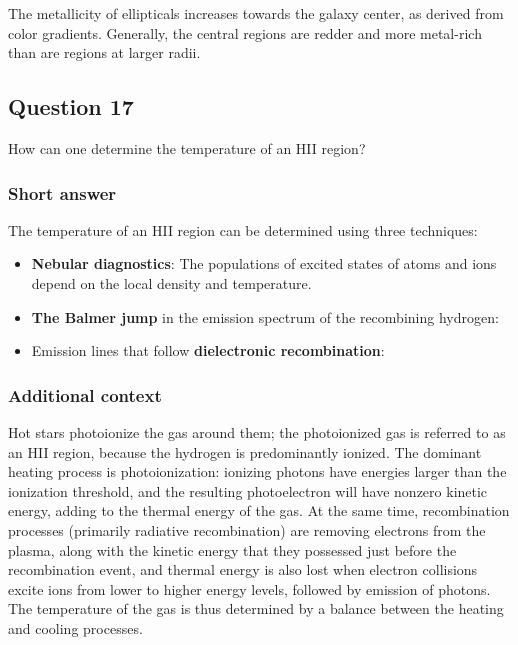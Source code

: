 \documentclass[a4paper,10pt]{article}
\begin{document}
{\noindent}The metallicity of ellipticals increases towards the galaxy center, as derived from color gradients. Generally, the central regions are redder and more metal-rich than are regions at larger radii.


\newpage
\subsection{Question 17}

How can one determine the temperature of an HII region?

\subsubsection{Short answer}

The temperature of an HII region can be determined using three techniques:

\begin{itemize}
    \item \textbf{Nebular diagnostics}: The populations of excited states of atoms and ions depend on the local density and temperature.
    \item \textbf{The Balmer jump} in the emission spectrum of the recombining hydrogen: 
    \item Emission lines that follow \textbf{dielectronic recombination}:
\end{itemize}

\subsubsection{Additional context}

{\noindent}Hot stars photoionize the gas around them; the photoionized gas is referred to as an HII region, because the hydrogen is predominantly ionized. The dominant heating process is photoionization: ionizing photons have energies larger than the ionization threshold, and the resulting photoelectron will have nonzero kinetic energy, adding to the thermal energy of the gas. At the same time, recombination processes (primarily radiative recombination) are removing electrons from the plasma, along with the kinetic energy that they possessed just before the recombination event, and thermal energy is also lost when electron collisions excite ions from lower to higher energy levels, followed by emission of photons. The temperature of the gas is thus determined by a balance between the heating and cooling processes.
\end{document}
